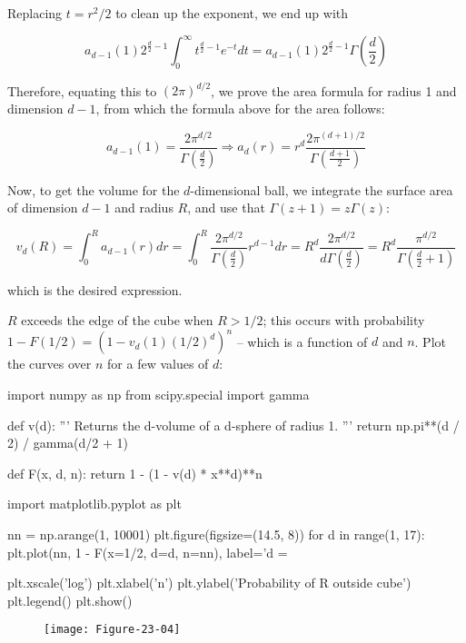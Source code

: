 Replacing \(t = r^{2} / 2\) to clean up the exponent, we end up with

\[ a_{d-1}(1) 2^{\frac{d}{2} - 1} \int_{0}^{\infty} t^{\frac{d}{2} - 1} e^{-t}  dt = a_{d-1}(1) 2^{\frac{d}{2} - 1} \Gamma \left( \frac{d}{2} \right)\]

Therefore, equating this to \((2 \pi)^{d/2}\), we prove the area formula
for radius 1 and dimension \(d - 1\), from which the formula above for
the area follows:

\[ a_{d - 1}(1) = \frac{2 \pi^{d/2}}{\Gamma \left( \frac{d}{2}\right)} \Longrightarrow a_d(r) = r^{d} \frac{2 \pi^{(d + 1)/2}}{\Gamma \left( \frac{d + 1}{2}\right)} \]

Now, to get the volume for the \(d\)-dimensional ball, we integrate the
surface area of dimension \(d-1\) and radius \(R\), and use that
\(\Gamma(z + 1) = z \Gamma(z)\):

\[ v_d(R) = \int_{0}^R a_{d-1}(r) dr = \int_{0}^R \frac{2 \pi^{d/2}}{\Gamma \left( \frac{d}{2}\right)} r^{d - 1} dr = R^{d} \frac{2 \pi^{d / 2}}{d \Gamma \left( \frac{d}{2} \right) } = R^{d} \frac{\pi^{d/2}}{\Gamma\left(\frac{d}{2} + 1\right)} \]

which is the desired expression.

\(R\) exceeds the edge of the cube when \(R > 1/2\); this occurs with
probability \(1 - F(1/2) = \left(1 - v_d(1) (1/2)^{d}\right)^{n}\) -- which
is a function of \(d\) and \(n\). Plot the curves over \(n\) for a
few values of \(d\):

\begin{python}
import numpy as np
from scipy.special import gamma

def v(d):
    ''' Returns the d-volume of a d-sphere of radius 1. '''
    return np.pi**(d / 2) / gamma(d/2 + 1)

def F(x, d, n):
    return 1 - (1 - v(d) * x**d)**n
\end{python}

\begin{python}
import matplotlib.pyplot as plt

nn = np.arange(1, 10001)
plt.figure(figsize=(14.5, 8))
for d in range(1, 17):
    plt.plot(nn, 1 - F(x=1/2, d=d, n=nn), label='d = %

plt.xscale('log')
plt.xlabel('n')
plt.ylabel('Probability of R outside cube')
plt.legend()
plt.show()
\end{python}

\begin{figure}[H]
\centering
\texttt{[image: Figure-23-04]}
\end{figure}

